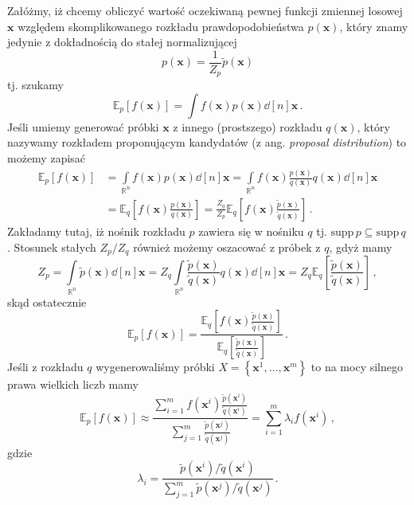 \documentclass{myclass}
\numberwithin{equation}{subsection}
\begin{document}
Załóżmy, iż chcemy obliczyć wartość oczekiwaną pewnej funkcji zmiennej losowej \(\mathbf{x}\)
względem skomplikowanego rozkładu prawdopodobieństwa \(p(\mathbf{x})\), który znamy jedynie z
dokładnością do stałej normalizującej
\begin{equation}
    p(\mathbf{x}) = \frac{1}{Z_p}\tilde{p}(\mathbf{x})
\end{equation}
tj. szukamy
\begin{equation}
    \mathbb{E}_p[f(\mathbf{x})] = \int f(\mathbf{x}) p(\mathbf{x})\dd[n]\mathbf{x}\,.
\end{equation}
Jeśli umiemy generować próbki \(\mathbf{x}\) z innego (prostszego) rozkładu \(q(\mathbf{x})\), który
nazywamy rozkładem proponującym kandydatów (z ang. \textit{proposal distribution}) to możemy zapisać
\begin{equation}
    \begin{split}
        \mathbb{E}_p[f(\mathbf{x})] &= \int\limits_{\mathbb{R}^n}f(\mathbf{x})p(\mathbf{x})\dd[n]\mathbf{x} = \int\limits_{\mathbb{R}^n}f(\mathbf{x})\frac{p(\mathbf{x})}{q(\mathbf{x})}q(\mathbf{x})\dd[n]\mathbf{x}\\
         &=\mathbb{E}_q\left[f(\mathbf{x}) \frac{p(\mathbf{x})}{q(\mathbf{x})}\right] = \frac{Z_q}{Z_p}\mathbb{E}_q\left[f(\mathbf{x}) \frac{\tilde{p}(\mathbf{x})}{\tilde{q}(\mathbf{x})}\right]\,.
    \end{split}
\end{equation}
Zakładamy tutaj, iż nośnik rozkładu \(p\) zawiera się w nośniku \(q\) tj. \(\text{supp}\,p \subseteq
\text{supp}\,q\). Stosunek stałych \(Z_p / Z_q\) również możemy oszacować z próbek z \(q\), gdyż
mamy
\begin{equation}
    Z_p = \int\limits_{\mathbb{R}^n}\tilde{p}(\mathbf{x})\dd[n]{\mathbf{x}} = Z_q\int\limits_{\mathbb{R}^n}\frac{\tilde{p}(\mathbf{x})}{\tilde{q}(\mathbf{x})} q(\mathbf{x})\dd[n]{\mathbf{x}} = Z_q \mathbb{E}_q\left[\frac{\tilde{p}(\mathbf{x})}{\tilde{q}(\mathbf{x})}\right]\,,
\end{equation}
skąd ostatecznie
\begin{equation}
    \mathbb{E}_p[f(\mathbf{x})] = \frac{\mathbb{E}_q\left[f(\mathbf{x}) \frac{\tilde{p}(\mathbf{x})}{\tilde{q}(\mathbf{x})}\right]}{\mathbb{E}_q\left[\frac{\tilde{p}(\mathbf{x})}{\tilde{q}(\mathbf{x})}\right]}\,.
\end{equation}
Jeśli z rozkładu \(q\) wygenerowaliśmy próbki \(X =
\left\{\mathbf{x}^1,\ldots,\mathbf{x}^m\right\}\) to na mocy silnego prawa wielkich liczb mamy
\begin{equation}\boxed{
    \mathbb{E}_p[f(\mathbf{x})] \approx \frac{\sum_{i=1}^m f(\mathbf{x}^i) \frac{\tilde{p}(\mathbf{x}^i)}{\tilde{q}(\mathbf{x}^i)}}{\sum_{j=1}^m \frac{\tilde{p}(\mathbf{x}^j)}{\tilde{q}(\mathbf{x}^j)}} = \sum_{i=1}^m \lambda_i f(\mathbf{x}^i)\,,
}\end{equation}
gdzie
\begin{equation}\boxed{
    \lambda_i = \frac{\tilde{p}(\mathbf{x}^i) / \tilde{q}(\mathbf{x}^i)}{\sum_{j=1}^m \tilde{p}(\mathbf{x}^j) / \tilde{q}(\mathbf{x}^j) }\,.
}\end{equation}
\end{document}
